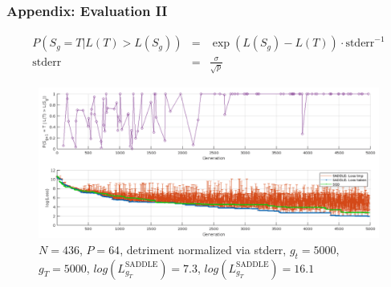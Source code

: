 \documentclass[xcolor=dvipsnames,envcountsect]{beamer}
\begin{document}
\begin{frame}\frametitle{Appendix: Evaluation II}
\begin{eqnarray}
P(S_g = T | L(T) > L(S_g)) &=& \exp{(L(S_g) - L(T)) \cdot \text{stderr}^{-1}} \\
\text{stderr}&=&\frac{\sigma}{\sqrt{p}}
\end{eqnarray}	
\begin{figure}
    \includegraphics[width=.7\textwidth]{plankton_p64_gt5k_gT5k_eps001_Pc}
    \caption{$N = 436$, $P = 64$, detriment normalized via stderr, $g_t = 5000$, $g_T = 5000$, $log(L^{\text{SADDLE}}_{g_T}) = 7.3$, $log(L^{\text{SADDLE}}_{g_T}) = 16.1$}
\end{figure}

\end{frame}

\end{document}
